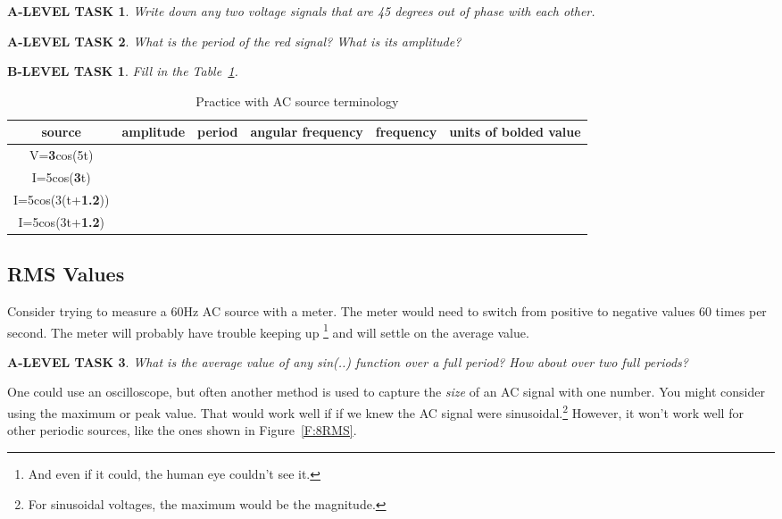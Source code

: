 \documentclass{book}
\numberwithin{equation}{section}
\newtheorem{alevel}{A-LEVEL TASK}
\newtheorem{blevel}{B-LEVEL TASK}
\theoremstyle{definition}
\begin{document}
\begin{alevel}
Write down any two voltage signals that are 45 degrees out of phase with each other.
\end{alevel}

\begin{alevel}
What is the period of the red signal? What is its amplitude?
\end{alevel}

\begin{blevel}
Fill in the Table~\ref{T:AC1}.
\end{blevel}

\begin{table}[H]
\begin{center}
\begin{tabular}{|c|c|c|c|c|c|} \hline
source&amplitude	&period	&angular frequency	&frequency &units of bolded value \\ \hline
V=\textbf{3}cos(5t)&		&&&& \\ \hline
I=5cos(\textbf{3}t)&		&&&& \\ \hline
I=5cos(3(t+\textbf{1.2}))&		&&&& \\ \hline
I=5cos(3t+\textbf{1.2})&		&&&& \\ \hline
\end{tabular}
\caption{Practice with AC source terminology}
\label{T:AC1}
\end{center}
\end{table}



\subsection{RMS Values}
Consider trying to measure a 60Hz AC source with a meter. The meter would need to switch from positive to negative values 60 times per second.  The meter will probably have trouble keeping up \footnote{And even if it could, the human eye couldn't see it.} and will settle on the average value.

\begin{alevel}
What is the average value of any sin(..) function over a full period? How about over two full periods?
\end{alevel}

One could use an oscilloscope, but often another method is used to capture the \emph{size} of an AC signal with one number.  You might consider using the maximum or peak value. That would work well if if we knew the AC signal were sinusoidal.\footnote{For sinusoidal voltages, the maximum would be the magnitude.} However, it won't work well for other periodic sources, like the ones shown in Figure~\ref{F:8RMS}.
\end{document}

